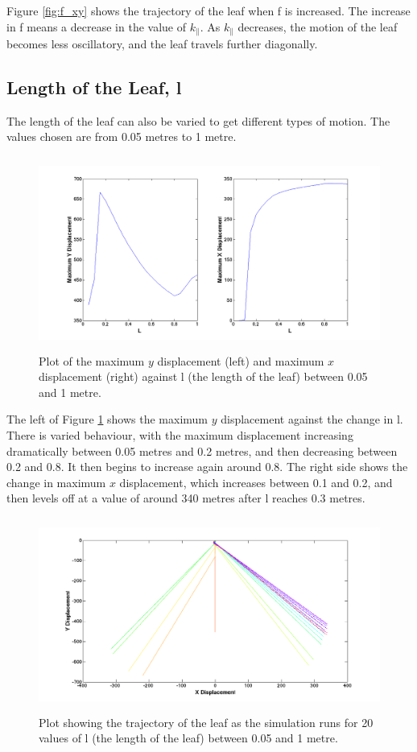 \noindent Figure \ref{fig:f_xy} shows the trajectory of the leaf when f is increased. The increase in f means a decrease in the value of $k_{\parallel}$. As $k_{\parallel}$ decreases, the motion of the leaf becomes less oscillatory, and the leaf travels further diagonally. 


\subsection{Length of the Leaf, l}
The length of the leaf can also be varied to get different types of motion. The values chosen are from 0.05 metres to 1 metre.  


\begin{figure}[H]
	\centering
	\includegraphics[width=1\textwidth, height=2.5in]{l_max.png}
	\caption{Plot of the maximum $y$ displacement (left) and maximum $x$ displacement (right) against l (the length of the leaf) between 0.05 and 1 metre. }\label{fig:lmax}
\end{figure}

\noindent The left of Figure \ref{fig:lmax} shows the maximum $y$ displacement against the change in l. There is varied behaviour, with the maximum displacement increasing dramatically between 0.05 metres and 0.2 metres, and then decreasing between 0.2 and 0.8. It then begins to increase again around 0.8. 
\newline \newline \noindent The right side shows the change in maximum $x$ displacement, which increases between 0.1 and 0.2, and then levels off at a value of around 340 metres after l reaches 0.3 metres. 

\begin{figure}[H]
	\centering
	\includegraphics[width=1\linewidth, height=2.5in]{l_xy.png}
	\caption{Plot showing the trajectory of the leaf as the simulation runs for 20 values of l (the length of the leaf) between 0.05 and 1 metre. }\label{fig:l_xy}
\end{figure}


